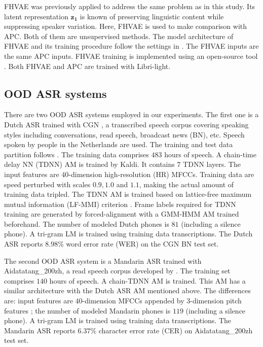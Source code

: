 \documentclass[a4paper]{article}
\begin{document}
FHVAE was previously applied \cite{Feng2019improving} to address the same problem as in this study. Its latent representation $\bm{z_1}$ is known of preserving linguistic content while suppressing speaker variation. Here, FHVAE is used to make comparison with APC. Both of them are unsupervised methods. The model architecture of FHVAE and its training procedure follow the settings in \cite{Feng2019improving}.
The FHVAE inputs  are  the same APC inputs. FHVAE training is implemented using an open-source tool \cite{hsu2017nips}. Both FHVAE and APC are trained with Libri-light. 
\subsection{OOD ASR systems}
There are two OOD ASR systems employed in our experiments. The first one is a Dutch ASR trained with CGN \cite{oostdijk2000spoken}, a transcribed speech corpus covering  speaking styles including conversations, read speech, broadcast news (BN), etc.
Speech spoken by people in the Netherlands are used. The training and test data partition follows \cite{laurensw75cgn_kaldi}. The training data comprises $483$
 hours of speech. A chain-time delay NN (TDNN) AM \cite{povey2016purely} is trained by Kaldi. It contains $7$ TDNN layers. The input features are $40$-dimension high-resolution (HR) MFCCs. Training data are speed perturbed with scales $0.9, 1.0$ and $1.1$, making the actual  amount of training data tripled. The TDNN AM is trained based on lattice-free maximum mutual information (LF-MMI) criterion \cite{povey2016purely}. Frame labels required for TDNN training are generated by forced-alignment with a GMM-HMM AM trained beforehand. The number of modeled Dutch phones is $81$ (including a silence phone).
 A tri-gram LM is trained using training data transcriptions. 
The Dutch ASR reports $8.98\%$ word error rate (WER) on the CGN BN test set.

The second OOD ASR system is a Mandarin ASR trained with Aidatatang\_200zh, a read speech corpus developed by \cite{aidatatang}. The training set comprises $140$ hours of speech. A chain-TDNN AM is trained. This AM has a similar architecture with the Dutch ASR AM mentioned above. The differences are: input features are $40$-dimension MFCCs appended by $3$-dimension pitch features \cite{ghahremani2014pitch}; the number of modeled Mandarin phones is $119$ (including a silence phone). 
A tri-gram LM is trained using training data transcriptions.
The Mandarin ASR reports $6.37\%$ character error rate (CER) on Aidatatang\_200zh test set.
\end{document}
